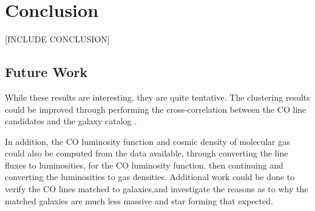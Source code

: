 \documentclass[twoside,single]{lion-msc}
\begin{document}




\chapter{Conclusion}

[INCLUDE CONCLUSION]

\section{Future Work}

While these results are interesting, they are quite tentative. The clustering results could be improved through performing the cross-correlation between the CO line candidates and the galaxy catalog \cite{hickox2011clustering, 10.1111/j.1365-2966.2011.20303.x, 10.1111/j.1365-2966.2008.14071.x}. 

In addition, the CO luminosity function and cosmic density of molecular gas could also be computed from the data available, through converting the line fluxes to luminosities, for the CO luminosity function. then continuing and converting the luminosities to gas densities. Additional work could be done to verify the CO lines matched to galaxies,and investigate the reasons as to why the matched galaxies are much less massive and star forming that expected.

\appendix
%



\end{document}
